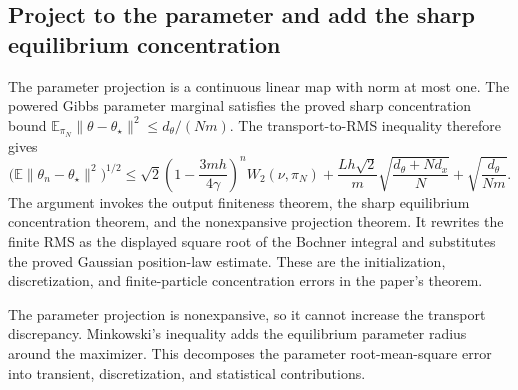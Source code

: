 \documentclass[11pt,a4paper]{report}
\begin{document}
\subsection{\texorpdfstring{Project to the parameter and add the sharp equilibrium concentration}{Project to the parameter and add the sharp equilibrium concentration}}
\label{report-step-KIPLMC-CanonicalExponential-lean-5}


The parameter projection is a continuous linear map with norm at most one. The powered Gibbs parameter marginal satisfies the proved sharp concentration bound \(\mathbb E_{\pi_N}\|\theta-\theta_\star\|^2\le d_\theta/(Nm)\). The transport-to-RMS inequality therefore gives \[\bigl(\mathbb E\|\theta_n-\theta_\star\|^2\bigr)^{1/2}\le\sqrt2\left(1-\frac{3mh}{4\gamma}\right)^nW_2(\nu,\pi_N)+\frac{Lh\sqrt2}{m}\sqrt{\frac{d_\theta+Nd_x}{N}}+\sqrt{\frac{d_\theta}{Nm}}.\] The argument invokes the output finiteness theorem, the sharp equilibrium concentration theorem, and the nonexpansive projection theorem. It rewrites the finite RMS as the displayed square root of the Bochner integral and substitutes the proved Gaussian position-law estimate. These are the initialization, discretization, and finite-particle concentration errors in the paper’s theorem.



The parameter projection is nonexpansive, so it cannot increase the transport discrepancy. Minkowski’s inequality adds the equilibrium parameter radius around the maximizer. This decomposes the parameter root-mean-square error into transient, discretization, and statistical contributions.
\end{document}
